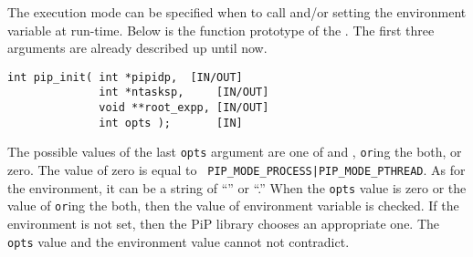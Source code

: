 The execution mode can be specified when to call 
and/or setting the  environment variable at
run-time. Below is the function prototype of the
. The first three arguments are already described
up until now.

\begin{lstlisting}[frame=tRBl]
int pip_init( int *pipidp,	[IN/OUT]
              int *ntasksp,     [IN/OUT]
              void **root_expp, [IN/OUT]
              int opts );       [IN]
\end{lstlisting}

The possible values of the last {\tt opts} argument are one of 
 and , {\tt or}ing
the both, or zero. The value of zero is equal to {\tt
  PIP_MODE_PROCESS|PIP_MODE_PTHREAD}. As for the 
environment, it can be a string of ``'' or
``.''
When the {\tt opts} value is zero or the value of {\tt or}ing the
both, then the value of  environment variable is
checked. If the environment is not set, then the PiP library chooses
an appropriate one. The {\tt opts} value and the environment value
cannot not contradict.


